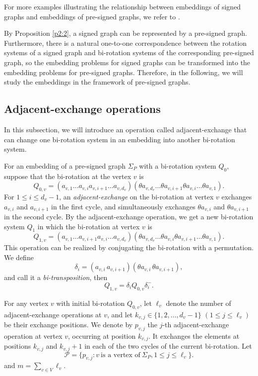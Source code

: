 \documentclass[10pt,a4paper]{amsart}
\begin{document}
For more examples illustrating the relationship between embeddings of signed graphs and embeddings of pre-signed graphs, we refer to \cite{Chen2026PreSigned,Chen2026PreSigned01}.

By Proposition \ref{p2:2}, a signed graph can be represented by a pre-signed graph. Furthermore, there is a natural one-to-one correspondence between the rotation systems of a signed graph and bi-rotation systems of the corresponding pre-signed graph, so the embedding problems for signed graphs can be transformed into the embedding problems for pre-signed graphs. Therefore, in the following, we will study the embeddings in the framework of pre-signed graphs.

\subsection{Adjacent-exchange operations}
In this subsection, we will introduce an operation called adjacent-exchange that can change one bi-rotation system in an embedding into another bi-rotation system.

For an embedding of a pre-signed graph $\Sigma_P$ with a bi-rotation system $Q_0$, suppose that the bi-rotation at the vertex $v$ is
$$Q_{0,v}=(a_{v,1}\ldots a_{v,i} a_{v,i+1}\ldots a_{v,d_v}) (\theta a_{v,d_v}\ldots\theta a_{v,i+1}  \theta a_{v,i}\ldots\theta a_{v,1}).$$
For $1\leq i\leq d_{v}-1$, an {\it adjacent-exchange} on the bi-rotation at vertex $v$ exchanges $a_{v,i}$ and $a_{v,i+1}$  in the first cycle, and simultaneously exchanges  $\theta a_{v,i}$ and
$\theta a_{v,i+1}$ in the second cycle.
By the adjacent-exchange operation, we get a new bi-rotation system $Q_1$ in which the  bi-rotation at vertex $v$ is
$$Q_{1,v}=(a_{v,1}\ldots a_{v,i+1} a_{v,i}\ldots a_{v,d_v}) (\theta a_{v,d_v}\ldots\theta a_{v,i}\theta a_{v,i+1}\ldots\theta a_{v,1}).$$
This operation can be realized by conjugating the bi-rotation with a permutation. We define
$$
\delta_i=
(a_{v,i}\,a_{v,i+1})
(\theta a_{v,i}\,\theta a_{v,i+1}),
$$and call it  a {\it bi-transposition}, then
$$Q_{1,v}=\delta_i Q_{0,v} \delta_i^-.$$

For any vertex $v$ with initial bi-rotation $Q_{0,v}$, let $\ell_v$ denote the number of  adjacent-exchange operations at $v$, and let $k_{v,j}\in\{1,2,\ldots,d_v-1\}$ $(1\leq j \leq \ell_v)$ be their exchange positions.
We denote by $p_{v,j}$ the $j$-th adjacent-exchange operation at vertex $v$, occurring at position $k_{v,j}$. It exchanges the elements at positions $k_{v,j}$ and $k_{v,j}+1$ in each of the two cycles of the current bi-rotation. Let
$$\mathcal P=\{p_{v,j}: v ~\mbox{is a vertex of}~ \Sigma_P, 1\leq j\leq \ell_v\}.$$ and $m=\sum_{v\in V}\ell_v$.
\end{document}
